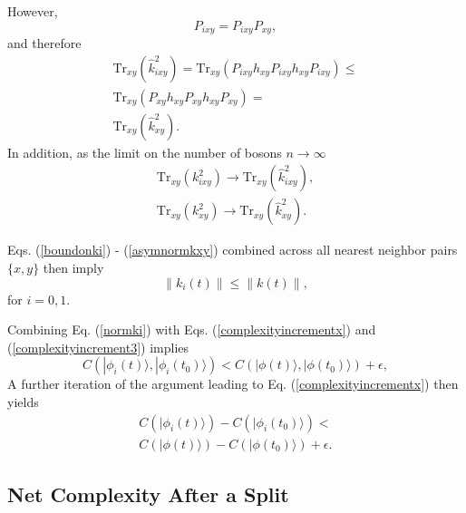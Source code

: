 \documentclass[twocolumn,amsmath,amssymb]{revtex4-1}
\begin{document}
However,
\begin{equation}
  \label{ppi}
  P_{ixy} = P_{ixy} P_{xy},
  \end{equation}
and therefore
\begin{multline}
  \label{boundonki}
  \mathrm{Tr}_{xy}( \hat{k}_{ixy}^2) = \mathrm{Tr}_{xy}( P_{ixy} h_{xy} P_{ixy} h_{xy}P_{ixy}) \le \\
  \mathrm{Tr}_{xy} (P_{xy} h_{xy} P_{xy} h_{xy} P_{xy}) = \\
  \mathrm{Tr}_{xy}( \hat{k}_{xy}^2).
\end{multline}
In addition, as the limit on the number of bosons $n \rightarrow \infty$ 
\begin{subequations}
\begin{eqnarray}
  \label{asymnormkixy}
  \mathrm{Tr}_{xy}(k_{ixy}^2) \rightarrow \mathrm{Tr}_{xy}(\hat{k}_{ixy}^2), \\
  \label{asymnormkxy}
  \mathrm{Tr}_{xy}(k_{xy}^2) \rightarrow \mathrm{Tr}_{xy}(\hat{k}_{xy}^2).
\end{eqnarray}
\end{subequations}

Eqs. (\ref{boundonki}) - (\ref{asymnormkxy})  combined across all nearest neighbor pairs $\{x, y\}$ then imply
\begin{equation}
  \label{normki}
  \parallel k_i(t) \parallel \le \parallel k(t) \parallel,
\end{equation}
for $i = 0, 1$.


Combining Eq. (\ref{normki}) with Eqs. (\ref{complexityincrementx}) and (\ref{complexityincrement3})
implies 
\begin{equation}
  \label{complexityincrementbound}
  C( |\phi_i(t) \rangle , |\phi_i(t_0) \rangle ) < C( |\phi(t) \rangle , |\phi(t_0) \rangle ) + \epsilon,
\end{equation}
A further iteration of the argument leading to Eq. (\ref{complexityincrementx})
then yields
\begin{multline}
  \label{complexityincrementbound1}
  C( |\phi_i(t) \rangle ) - C(|\phi_i(t_0) \rangle ) < \\
  C( |\phi(t) \rangle ) - C(|\phi(t_0) \rangle ) + \epsilon.
\end{multline}



\subsection{\label{subsec:after1} Net Complexity After a Split}
\end{document}
